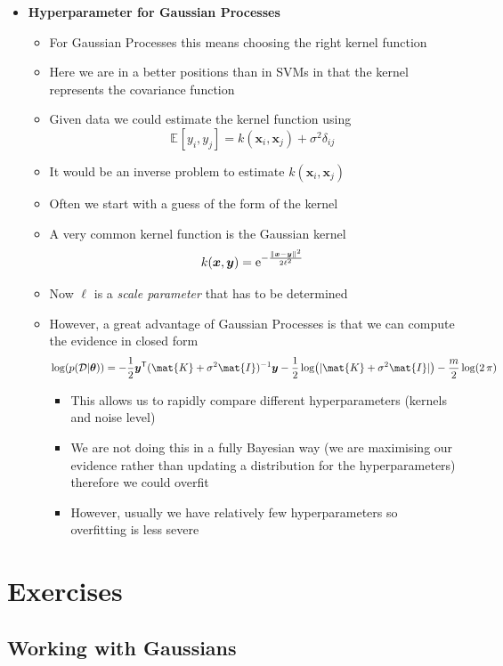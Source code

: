 \documentclass[11pt]{article}
\newcommand{\tr}{\textsf{T}}
\newcommand{\av}[2][]{\mathbb{E}_{#1\!}\left[ #2 \right]}
\newcommand{\logg}[1]{\log\!\left( #1 \right)}
\newcommand{\e}[1]{{\rm e}^{#1}}
\begin{document}
\begin{itemize}
\begin{itemize}
\begin{itemize}
are forced to estimate it using Monte-Carlo techniques
\end{itemize}
\end{itemize}
\item \textbf{Hyperparameter for Gaussian Processes}
\begin{itemize}
\item For Gaussian Processes this means choosing the right kernel function
\item Here we are in a better positions than in SVMs in that the kernel
represents the covariance function
\item Given data we could estimate the kernel function using
$$ \av{y_i,y_j} = k(\bm{x}_i,\bm{x}_j) + \sigma^2 \delta_{ij} $$
\item It would be an inverse problem to estimate \(k(\bm{x}_i,\bm{x}_j)\)
\item Often we start with a guess of the form of the kernel
\item A very common kernel function is the Gaussian kernel
$$ k(\bm{x},\bm{y}) = \e{-\frac{\|\bm{x}-\bm{y}\|^2}{2\ell^2}} $$
\item Now \(\ell\) is a \emph{scale parameter} that has to be determined
\item However, a great advantage of Gaussian Processes is that we can
compute the evidence in closed form
$$  \logg{p(\mathcal{D}|\bm{\theta})} = - \frac{1}{2} \bm{y}^\tr (\mat{K}+\sigma^2\mat{I})^{-1} \bm{y} - \frac{1}{2}  \logg{|\mat{K}+\sigma^2\mat{I}|} - \frac{m}{2} \log(2\,\pi) $$
\begin{itemize}
\item This allows us to rapidly compare different hyperparameters
(kernels and noise level)
\item We are not doing this in a fully Bayesian way (we are
maximising our evidence rather than updating a distribution
for the hyperparameters) therefore we could overfit
\item However, usually we have relatively few hyperparameters so
overfitting is less severe
\end{itemize}
\end{itemize}
\end{itemize}
\section{Exercises}
\label{sec:org480759c}

\subsection{Working with Gaussians}
\label{sec:org786fd7a}
\end{document}
